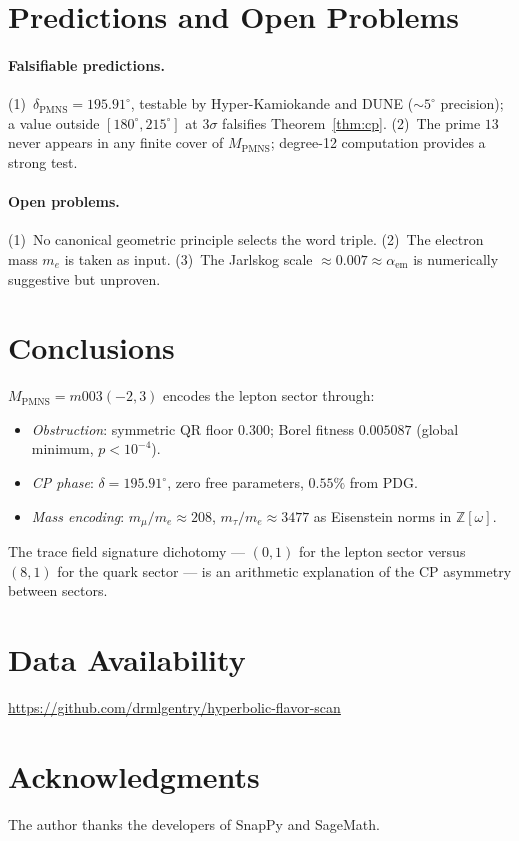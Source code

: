 \documentclass[11pt,a4paper]{article}
\theoremstyle{definition}
\newcommand{\MPMNS}{M_{\mathrm{PMNS}}}
\newcommand{\Zom}{\mathbb{Z}[\omega]}
\begin{document}
\section{Predictions and Open Problems}
\label{sec:predictions}

\paragraph{Falsifiable predictions.}
(1)~$\delta_{\mathrm{PMNS}}=195.91^\circ$, testable by
Hyper-Kamiokande and DUNE (${\sim}5^\circ$ precision);
a value outside $[180^\circ,215^\circ]$ at $3\sigma$
falsifies Theorem~\ref{thm:cp}.
(2)~The prime $13$ never appears in any finite cover of $\MPMNS$;
degree-12 computation provides a strong test.

\paragraph{Open problems.}
(1)~No canonical geometric principle selects the word triple.
(2)~The electron mass $m_e$ is taken as input.
(3)~The Jarlskog scale $\approx0.007\approx\alpha_{\mathrm{em}}$
is numerically suggestive but unproven.

\section{Conclusions}
\label{sec:conclusions}

$\MPMNS=m003(-2,3)$ encodes the lepton sector through:
\begin{itemize}
\item \emph{Obstruction}: symmetric QR floor $0.300$;
  Borel fitness $0.005087$ (global minimum, $p<10^{-4}$).
\item \emph{CP phase}: $\delta=195.91^\circ$,
  zero free parameters, $0.55\%$ from PDG.
\item \emph{Mass encoding}: $m_\mu/m_e\approx208$,
  $m_\tau/m_e\approx3477$ as Eisenstein norms in $\Zom$.
\end{itemize}
The trace field signature dichotomy --- $(0,1)$ for the lepton
sector versus $(8,1)$ for the quark sector ---
is an arithmetic explanation of the CP asymmetry between sectors.

\section*{Data Availability}
\url{https://github.com/drmlgentry/hyperbolic-flavor-scan}

\section*{Acknowledgments}
The author thanks the developers of SnapPy and SageMath.
\end{document}
